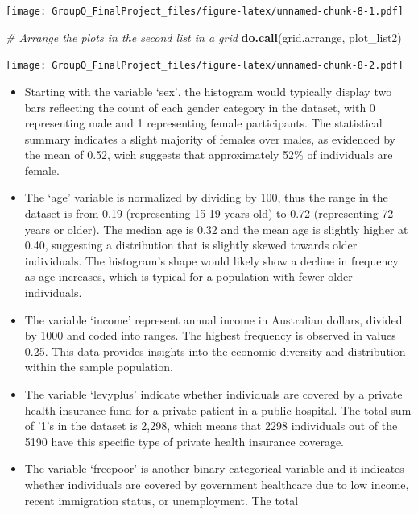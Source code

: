 \documentclass[
]{article}
\newenvironment{Shaded}{\begin{snugshade}}{\end{snugshade}}
\newcommand{\CommentTok}[1]{\textcolor[rgb]{0.56,0.35,0.01}{\textit{#1}}}
\newcommand{\FunctionTok}[1]{\textcolor[rgb]{0.13,0.29,0.53}{\textbf{#1}}}
\newcommand{\NormalTok}[1]{#1}
\providecommand{\tightlist}{%
  \setlength{\itemsep}{0pt}\setlength{\parskip}{0pt}}
\begin{document}
\texttt{[image: GroupO\_FinalProject\_files/figure-latex/unnamed-chunk-8-1.pdf]}

\begin{Shaded}
\begin{Highlighting}[]
\CommentTok{\# Arrange the plots in the second list in a grid}
\FunctionTok{do.call}\NormalTok{(grid.arrange, plot\_list2)}
\end{Highlighting}
\end{Shaded}

\texttt{[image: GroupO\_FinalProject\_files/figure-latex/unnamed-chunk-8-2.pdf]}

\begin{itemize}
\tightlist
\item
  Starting with the variable `sex', the histogram would typically
  display two bars reflecting the count of each gender category in the
  dataset, with 0 representing male and 1 representing female
  participants. The statistical summary indicates a slight majority of
  females over males, as evidenced by the mean of 0.52, wich suggests
  that approximately 52\% of individuals are female.
\item
  The `age' variable is normalized by dividing by 100, thus the range in
  the dataset is from 0.19 (representing 15-19 years old) to 0.72
  (representing 72 years or older). The median age is 0.32 and the mean
  age is slightly higher at 0.40, suggesting a distribution that is
  slightly skewed towards older individuals. The histogram's shape would
  likely show a decline in frequency as age increases, which is typical
  for a population with fewer older individuals.
\item
  The variable `income' represent annual income in Australian dollars,
  divided by 1000 and coded into ranges. The highest frequency is
  observed in values 0.25. This data provides insights into the economic
  diversity and distribution within the sample population.
\item
  The variable `levyplus' indicate whether individuals are covered by a
  private health insurance fund for a private patient in a public
  hospital. The total sum of '1's in the dataset is 2,298, which means
  that 2298 individuals out of the 5190 have this specific type of
  private health insurance coverage.
\item
  The variable `freepoor' is another binary categorical variable and it
  indicates whether individuals are covered by government healthcare due
  to low income, recent immigration status, or unemployment. The total

\end{itemize}
\end{document}
